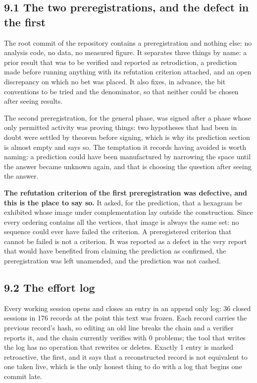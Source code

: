 \documentclass[11pt,a4paper]{article}
\begin{document}
\subsection*{9.1 The two preregistrations, and the defect in the first}

The root commit of the repository contains a preregistration and nothing else: no analysis code, no data, no measured figure. It separates three things by name: a prior result that was to be verified and reported as retrodiction, a prediction made before running anything with its refutation criterion attached, and an open discrepancy on which no bet was placed. It also fixes, in advance, the bit conventions to be tried and the denominator, so that neither could be chosen after seeing results.

The second preregistration, for the general phase, was signed after a phase whose only permitted activity was proving things: two hypotheses that had been in doubt were settled by theorem before signing, which is why its prediction section is almost empty and says so. The temptation it records having avoided is worth naming: a prediction could have been manufactured by narrowing the space until the answer became unknown again, and that is choosing the question after seeing the answer.

\textbf{The refutation criterion of the first preregistration was defective, and this is the place to say so.} It asked, for the prediction, that a hexagram be exhibited whose image under complementation lay outside the construction. Since every ordering contains all the vertices, that image is always the same set: no sequence could ever have failed the criterion. A preregistered criterion that cannot be failed is not a criterion. It was reported as a defect in the very report that would have benefited from claiming the prediction as confirmed, the preregistration was left unamended, and the prediction was not cashed.

\subsection*{9.2 The effort log}

Every working session opens and closes an entry in an append only log: 36 closed sessions in 176 records at the point this text was frozen. Each record carries the previous record's hash, so editing an old line breaks the chain and a verifier reports it, and the chain currently verifies with 0 problems; the tool that writes the log has no operation that rewrites or deletes. Exactly 1 entry is marked retroactive, the first, and it says that a reconstructed record is not equivalent to one taken live, which is the only honest thing to do with a log that begins one commit late.
\end{document}
